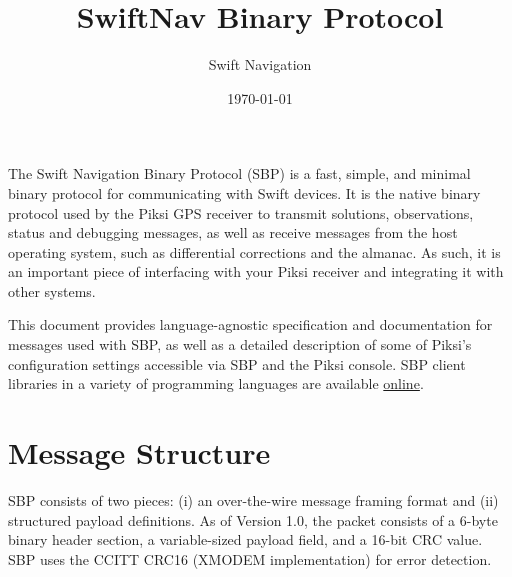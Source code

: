 \documentclass{article}
\title{SwiftNav Binary Protocol}
\author{Swift Navigation}
\date{\today}
\makeatletter
\numberwithin{table}{subsection}
\numberwithin{field}{subsection}
\renewcommand\tableofcontents{\@starttoc{toc}}
\makeatother
\begin{document}
\maketitle
\begin{normalsize}
\setcounter{tocdepth}{2}
\begin{centering}
\tableofcontents
\end{centering}
\end{normalsize}

\thispagestyle{firstpage}
\bigskip
\bigskip
\begin{large}
The Swift Navigation Binary Protocol (SBP) is a fast, simple, and
minimal binary protocol for communicating with Swift devices. It is
the native binary protocol used by the Piksi GPS receiver to transmit
solutions, observations, status and debugging messages, as well as
receive messages from the host operating system, such as differential
corrections and the almanac. As such, it is an important piece of
interfacing with your Piksi receiver and integrating it with other
systems.

This document provides language-agnostic specification and
documentation for messages used with SBP, as well as a detailed
description of some of Piksi's configuration settings accessible via
SBP and the Piksi console. SBP client libraries in a variety of
programming languages are available
\href{http://docs.swiftnav.com/wiki/SwiftNav_Binary_Protocol}{online}.
\end{large}

\newpage
\section{Message Structure}
\label{sec:Message}

\begin{large}
SBP consists of two pieces: (i) an over-the-wire message framing
format and (ii) structured payload definitions. As of Version 1.0, the
packet consists of a 6-byte binary header section, a variable-sized
payload field, and a 16-bit CRC value. SBP uses the CCITT CRC16
(XMODEM implementation) for error detection.
\end{large}
\end{document}
